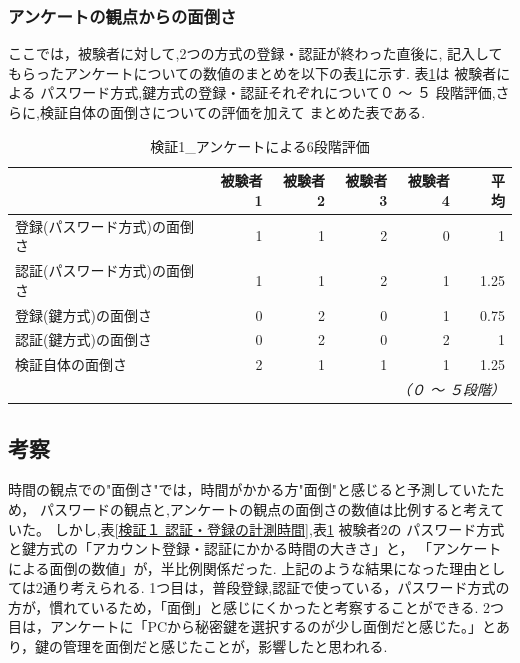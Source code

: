     \subsubsection{アンケートの観点からの面倒さ}
        ここでは，被験者に対して,2つの方式の登録・認証が終わった直後に,
        記入してもらったアンケートについての数値のまとめを以下の表\ref{検証１ アンケートによる６段階評価}に示す.
        表\ref{検証１ アンケートによる６段階評価}は 被験者による パスワード方式,鍵方式の登録・認証それぞれについて０ 〜 ５ 段階評価,さらに,検証自体の面倒さについての評価を加えて まとめた表である.
        \begin{table}[htb]
            \caption{検証1\_アンケートによる6段階評価}
            \label{検証１ アンケートによる６段階評価}
            \begin{tabular}{|l|r|r|r|r|r|} \hline%
                                        & 被験者1 & 被験者2 & 被験者3  & 被験者4 &　平均 \\ \hline%
                登録(パスワード方式)の面倒さ & 1 & 1 & 2 & 0 & 1 \\ \hline
                認証(パスワード方式)の面倒さ & 1 & 1 & 2 & 1 & 1.25 \\ \hline
                登録(鍵方式)の面倒さ       & 0 & 2 & 0 & 1 & 0.75 \\ \hline
                認証(鍵方式)の面倒さ       & 0 & 2 & 0 & 2 & 1 \\ \hline
                検証自体の面倒さ　      & 2 & 1 & 1 & 1 & 1.25 \\ \hline
    
                \multicolumn{6}{r}{\small\it （０ 〜 ５段階）}\\
            \end{tabular}
        \end{table}


 \newpage


 \subsection{考察}
 時間の観点での"面倒さ"では，時間がかかる方"面倒"と感じると予測していたため，
 パスワードの観点と,アンケートの観点の面倒さの数値は比例すると考えていた。
 しかし,表\ref{検証１ 認証・登録の計測時間},表\ref{検証１ アンケートによる６段階評価} 被験者2の
 パスワード方式と鍵方式の「アカウント登録・認証にかかる時間の大きさ」と，
 「アンケートによる面倒の数値」が，半比例関係だった.
 上記のような結果になった理由としては2通り考えられる.
 1つ目は，普段登録,認証で使っている，パスワード方式の方が，慣れているため，「面倒」と感じにくかったと考察することができる.
 2つ目は，アンケートに「PCから秘密鍵を選択するのが少し面倒だと感じた。」とあり，鍵の管理を面倒だと感じたことが，影響したと思われる.

